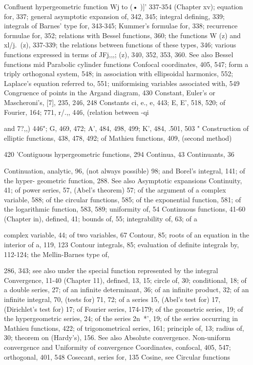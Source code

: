 Confluent hypergeometric function  Wj  to (• )]' 337-354 (Chapter xv); equation for, 337; general
asymptotic expansion of, 342, 345; integral defining, 339; integrals of Barnes' type for,
343-345; Kummer's formulae for, 338; recurrence formulae for, 352; relations with Bessel
functions, 360; the functions W    (z) and xl/j.\,  (z), 337-339; the relations between functions
of these types, 346; various functions expressed in terms of JFj,,,; (z), 340, 352, 353, 360. See
also Bessel functions mid Parabolic cylinder functions
Confocal coordinates, 405, 547; form a triply orthogonal system, 548; in association with
ellipsoidal harmonics, 552; Laplace's equation referred to, 551; uniformising variables
associated with, 549
Congruence of points in the Argand diagram, 430
Constant, Euler's or Mascheroni's, [7], 235, 246, 248
Constants ci, e., e, 443; E, E', 518, 520; of Fourier, 164; 771, r/.,, 446, (relation between -qi

and 7?,,) 446"; G, 469, 472; A', 484, 498, 499; K', 484, .501, 503 "
Construction of elliptic functions, 438, 478, 492; of Mathieu functions, 409, (second method)

420
'Contiguous hypergeometric functions, 294
Continua, 43
Continuants, 36

Continuation, analytic, 96, (not always possible) 98; and Borel's integral, 141; of the hyper-
geometric function, 288. See also Asymptotic expansions
Continuity, 41; of power series, 57, (Abel's theorem) 57; of the argument of a complex variable,
588; of the circular functions, 585; of the exponential function, 581; of the logarithmic
function, 583, 589; uniformity of, 54
Continuous functions, 41-60 (Chapter in), defined, 41; bounds of, 55; integrability of, 63; of a

complex variable, 44; of two variables, 67
Contour, 85; roots of an equation in the interior of a, 119, 123
Contour integrals, 85; evaluation of definite integrals by, 112-124; the Mellin-Barnes type of,

286, 343; see also under the special function represented by the integral
Convergence, 11-40 (Chapter 11), defined, 13, 15; circle of, 30; conditional, 18; of a double
series, 27; of an infinite determinant, 36; of an infinite product, 32; of an infinite integral,
70, (tests for) 71, 72; of a series 15, (Abel's test for) 17, (Dirichlet's test for) 17; of Fourier
series, 174-179; of the geometric series, 19; of the hypergeometric series, 24; of the series
2n~*', 19; of the series occurring in Mathieu functions, 422; of trigonometrical series, 161;
principle of, 13; radius of, 30; theorem on (Hardy's), 156. See also Absolute convergence.
Non-uniform convergence and Uniformity of convergence
Coordinates, confocal, 405, 547; orthogonal, 401, 548
Cosecant, series for, 135
Cosine, see Circular functions

